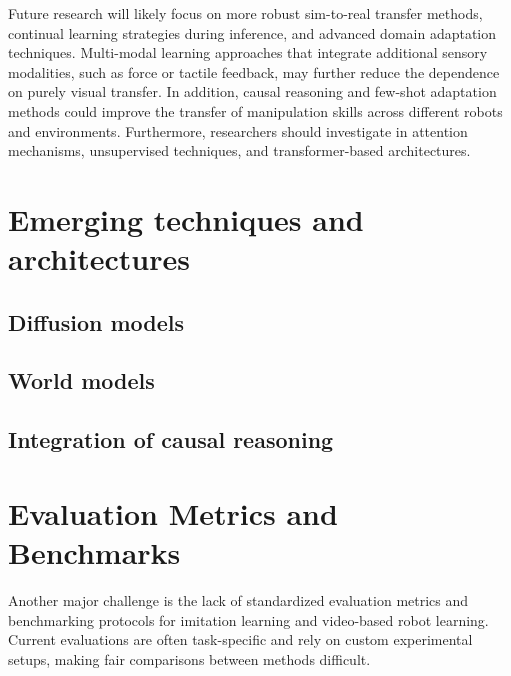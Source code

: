 Future research will likely focus on more robust sim-to-real transfer methods, continual learning strategies during inference, and advanced domain adaptation techniques. Multi-modal learning approaches that integrate additional sensory modalities, such as force or tactile feedback, may further reduce the dependence on purely visual transfer. In addition, causal reasoning and few-shot adaptation methods could improve the transfer of manipulation skills across different robots and environments. Furthermore, researchers should investigate in attention mechanisms, unsupervised techniques, and transformer-based architectures.








\section{Emerging techniques and architectures}

\subsection{Diffusion models}
\subsection{World models}
\subsection{Integration of causal reasoning}

\section{Evaluation Metrics and Benchmarks}
Another major challenge is the lack of standardized evaluation metrics and benchmarking protocols for imitation learning and video-based robot learning. Current evaluations are often task-specific and rely on custom experimental setups, making fair comparisons between methods difficult.

